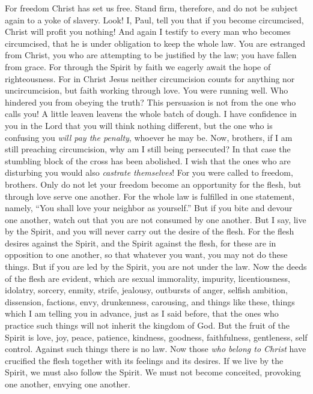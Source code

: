 \begin{biblechapter} %
 For freedom Christ has set us free. Stand firm, therefore, and do not be subject again to a yoke of slavery.
\verse Look! I, Paul, tell you that if you become circumcised, Christ will profit you nothing!
\verse And again I testify to every man who becomes circumcised, that he is under obligation to keep the whole law.
\verse You are estranged from Christ, you who are attempting to be justified by the law; you have fallen from grace.
\verse For through the Spirit by faith we eagerly await the hope of righteousness.
\verse For in Christ Jesus neither circumcision counts for anything nor uncircumcision, but faith working through love.
\verse You were running well. Who hindered you from obeying the truth?
\verse This persuasion is not from the one who calls you!
\verse A little leaven leavens the whole batch of dough.
\verse I have confidence in you in the Lord that you will think nothing different, but the one who is confusing you \textit{will pay the penalty}, whoever he may be.
\verse Now, brothers, if I am still preaching circumcision, why am I still being persecuted? In that case the stumbling block of the cross has been abolished.
\verse I wish that the ones who are disturbing you would also \textit{castrate themselves}!
\verse For you were called to freedom, brothers. Only do not let your freedom become an opportunity for the flesh, but through love serve one another.
\verse For the whole law is fulfilled in one statement, namely, “You shall love your neighbor as yourself.”
\verse But if you bite and devour one another, watch out that you are not consumed by one another.
 But I say, live by the Spirit, and you will never carry out the desire of the flesh.
\verse For the flesh desires against the Spirit, and the Spirit against the flesh, for these are in opposition to one another, so that whatever you want, you may not do these things.
\verse But if you are led by the Spirit, you are not under the law.
\verse Now the deeds of the flesh are evident, which are sexual immorality, impurity, licentiousness,
\verse idolatry, sorcery, enmity, strife, jealousy, outbursts of anger, selfish ambition, dissension, factions,
\verse envy, drunkenness, carousing, and things like these, things which I am telling you in advance, just as I said before, that the ones who practice such things will not inherit the kingdom of God.
\verse But the fruit of the Spirit is love, joy, peace, patience, kindness, goodness, faithfulness,
\verse gentleness, self control. Against such things there is no law.
\verse Now those \textit{who belong to Christ} have crucified the flesh together with its feelings and its desires.
\verse If we live by the Spirit, we must also follow the Spirit.
\verse We must not become conceited, provoking one another, envying one another.
\end{biblechapter}


